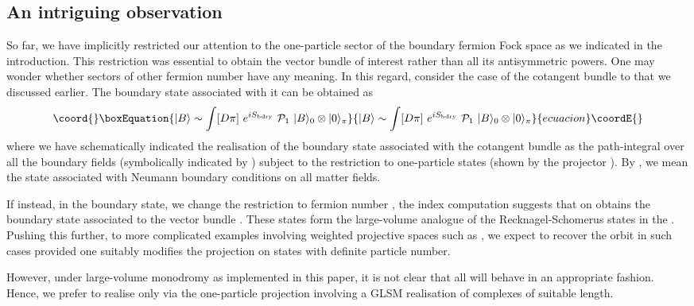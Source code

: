 \documentclass[a4paper,12pt]{article}
\begin{document}
\subsection{An intriguing observation}

So far, we have implicitly restricted our attention to  the one-particle
sector of the boundary fermion Fock space as we indicated in the
introduction. This restriction was essential to obtain the vector bundle
of interest rather than all its antisymmetric powers.   One may wonder
whether sectors of other fermion number have any meaning. In this
regard, consider the case of the  cotangent bundle to \coordHE{} that we
discussed earlier. The boundary state associated with it can be obtained
as
\begin{equation}\coord{}\boxEquation{
|B\rangle \sim \int [D\pi]\ e^{ iS_{\rm bdry}}\  {\cal P}_1\  |B\rangle_0
\otimes |0\rangle_\pi
}{
|B\rangle \sim \int [D\pi]\ e^{ iS_{\rm bdry}}\  {\cal P}_1\  |B\rangle_0
\otimes |0\rangle_\pi
}{ecuacion}\coordE{}\end{equation}
where we have schematically indicated the realisation of the boundary
state associated with the cotangent bundle as the path-integral
over all the boundary fields (symbolically indicated by \myHighlight{$[D\pi]$}\coordHE{})
subject to the restriction to one-particle
states (shown by the projector \coordHE{}). By \coordHE{}, we mean
the state associated with Neumann boundary conditions on all
matter fields. 

If instead, in the boundary state, we  change the
restriction to fermion number \coordHE{}, the index computation suggests that
on obtains the  boundary state associated to the vector bundle
\coordHE{}. These states form the large-volume analogue of
the Recknagel-Schomerus states in the \coordHE{}. Pushing this
further, to more complicated examples involving weighted projective
spaces such as \coordHE{}, we expect to  recover the \coordHE{}
orbit in such cases provided one suitably modifies
the projection on states with definite particle number.

However, under large-volume monodromy as implemented in this paper, it
is not clear that all \coordHE{} will behave in an appropriate
fashion.  Hence, we prefer to realise \coordHE{} only via the
one-particle projection involving  a GLSM realisation of
complexes of suitable length.
\end{document}
